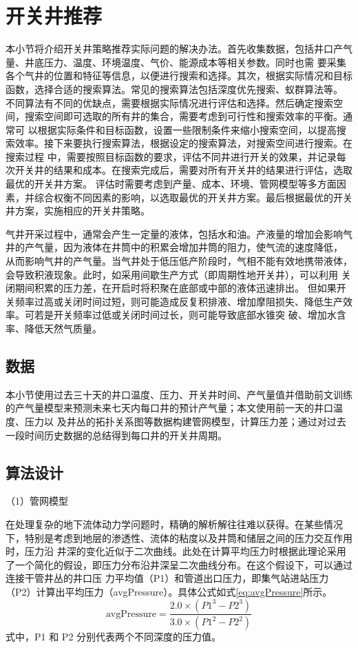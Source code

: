 \section{开关井推荐}
本小节将介绍开关井策略推荐实际问题的解决办法。首先收集数据，包括井口产气量、井底压力、温度、环境温度、气价、能源成本等相关参数。同时也需
要采集各个气井的位置和特征等信息，以便进行搜索和选择。其次，根据实际情况和目标函数，选择合适的搜索算法。常见的搜索算法包括深度优先搜索、蚁群算法等。
不同算法有不同的优缺点，需要根据实际情况进行评估和选择。然后确定搜索空间，搜索空间即可选取的所有井的集合，需要考虑到可行性和搜索效率的平衡。通常可
以根据实际条件和目标函数，设置一些限制条件来缩小搜索空间，以提高搜索效率。接下来要执行搜索算法，根据设定的搜索算法，对搜索空间进行搜索。在搜索过程
中，需要按照目标函数的要求，评估不同井进行开关的效果，并记录每次开关井的结果和成本。在搜索完成后，需要对所有开关井的结果进行评估，选取最优的开关井方案。
评估时需要考虑到产量、成本、环境、管网模型等多方面因素，并综合权衡不同因素的影响，以选取最优的开关井方案。最后根据最优的开关井方案，实施相应的开关井策略。

气井开采过程中，通常会产生一定量的液体，包括水和油。产液量的增加会影响气井的产气量，因为液体在井筒中的积累会增加井筒的阻力，使气流的速度降低，
从而影响气井的产气量。当气井处于低压低产阶段时，气相不能有效地携带液体，会导致积液现象。此时，如采用间歇生产方式（即周期性地开关井），可以利用
关闭期间积累的压力差，在开启时将积聚在底部或中部的液体迅速排出。
但如果开关频率过高或关闭时间过短，则可能造成反复积排液、增加摩阻损失、降低生产效率。可若是开关频率过低或关闭时间过长，则可能导致底部水锥突
破、增加水含率、降低天然气质量。
\subsection{数据}
本小节使用过去三十天的井口温度、压力、开关井时间、产气量值并借助前文训练的产气量模型来预测未来七天内每口井的预计产气量；本文使用前一天的井口温度、压力以
及井丛的拓扑关系图等数据构建管网模型，计算压力差；通过对过去一段时间历史数据的总结得到每口井的开关井周期。
\subsection{算法设计}

（1）管网模型

在处理复杂的地下流体动力学问题时，精确的解析解往往难以获得。在某些情况下，特别是考虑到地层的渗透性、流体的粘度以及井筒和储层之间的压力交互作用时，压力沿
井深的变化近似于二次曲线。此处在计算平均压力时根据此理论采用了一个简化的假设，即压力分布沿井深呈二次曲线分布。在这个假设下，可以通过连接干管井丛的井口压
力平均值（P1）和管道出口压力，即集气站进站压力（P2）计算出平均压力（avgPressure）。具体公式如式\eqref{eq:avgPressure}所示。
\begin{equation}
    \text{avgPressure} = \frac{2.0 \times (P1^3 - P2^3)}{3.0 \times (P1^2 - P2^2)}
    \label{eq:avgPressure}
\end{equation}
式中，P1 和 P2 分别代表两个不同深度的压力值。

